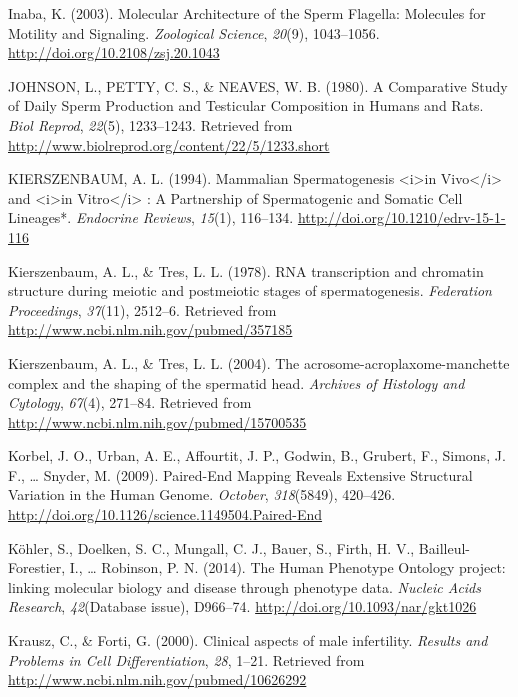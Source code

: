 \documentclass[12pt,twoside]{reedthesis}
\theoremstyle{definition}
\theoremstyle{definition}
\theoremstyle{remark}
\begin{document}
  \hypertarget{ref-Inaba2003}{}
  Inaba, K. (2003). Molecular Architecture of the Sperm Flagella:
  Molecules for Motility and Signaling. \emph{Zoological Science},
  \emph{20}(9), 1043--1056. \url{http://doi.org/10.2108/zsj.20.1043}
  
  \hypertarget{ref-Johnson1980}{}
  JOHNSON, L., PETTY, C. S., \& NEAVES, W. B. (1980). A Comparative Study
  of Daily Sperm Production and Testicular Composition in Humans and Rats.
  \emph{Biol Reprod}, \emph{22}(5), 1233--1243. Retrieved from
  \url{http://www.biolreprod.org/content/22/5/1233.short}
  
  \hypertarget{ref-KIERSZENBAUM1994}{}
  KIERSZENBAUM, A. L. (1994). Mammalian Spermatogenesis
  \textless{}i\textgreater{}in Vivo\textless{}/i\textgreater{} and
  \textless{}i\textgreater{}in Vitro\textless{}/i\textgreater{} : A
  Partnership of Spermatogenic and Somatic Cell Lineages*. \emph{Endocrine
  Reviews}, \emph{15}(1), 116--134.
  \url{http://doi.org/10.1210/edrv-15-1-116}
  
  \hypertarget{ref-Kierszenbaum1978}{}
  Kierszenbaum, A. L., \& Tres, L. L. (1978). RNA transcription and
  chromatin structure during meiotic and postmeiotic stages of
  spermatogenesis. \emph{Federation Proceedings}, \emph{37}(11), 2512--6.
  Retrieved from \url{http://www.ncbi.nlm.nih.gov/pubmed/357185}
  
  \hypertarget{ref-Kierszenbaum2004}{}
  Kierszenbaum, A. L., \& Tres, L. L. (2004). The
  acrosome-acroplaxome-manchette complex and the shaping of the spermatid
  head. \emph{Archives of Histology and Cytology}, \emph{67}(4), 271--84.
  Retrieved from \url{http://www.ncbi.nlm.nih.gov/pubmed/15700535}
  
  \hypertarget{ref-Korbel2009}{}
  Korbel, J. O., Urban, A. E., Affourtit, J. P., Godwin, B., Grubert, F.,
  Simons, J. F., \ldots{} Snyder, M. (2009). Paired-End Mapping Reveals
  Extensive Structural Variation in the Human Genome. \emph{October},
  \emph{318}(5849), 420--426.
  \url{http://doi.org/10.1126/science.1149504.Paired-End}
  
  \hypertarget{ref-Kohler2014}{}
  Köhler, S., Doelken, S. C., Mungall, C. J., Bauer, S., Firth, H. V.,
  Bailleul-Forestier, I., \ldots{} Robinson, P. N. (2014). The Human
  Phenotype Ontology project: linking molecular biology and disease
  through phenotype data. \emph{Nucleic Acids Research},
  \emph{42}(Database issue), D966--74.
  \url{http://doi.org/10.1093/nar/gkt1026}
  
  \hypertarget{ref-Krausz2000}{}
  Krausz, C., \& Forti, G. (2000). Clinical aspects of male infertility.
  \emph{Results and Problems in Cell Differentiation}, \emph{28}, 1--21.
  Retrieved from \url{http://www.ncbi.nlm.nih.gov/pubmed/10626292}
  
\end{document}
